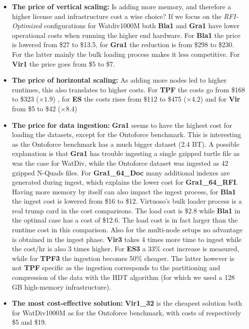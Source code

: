 \begin{itemize}
	\item \textbf{The price of vertical scaling:} Is adding more memory, and therefore a higher license and infrastructure cost a wise choice? If we focus on the \emph{RFI-Optimized} configurations for Watdiv1000M both \textbf{Bla1} and \textbf{Gra1} have lower operational costs when running the higher end hardware. For \textbf{Bla1} the price is lowered from \$27 to \$13.5, for \textbf{Gra1} the reduction is from \$298 to \$230. For the latter mainly the bulk loading process makes it less competitive. For \textbf{Vir1} the price goes from \$5 to \$7.
	
	\item \textbf{The price of horizontal scaling:} As adding more nodes led to higher runtimes, this also translates to higher costs. For \textbf{TPF} the costs go from \$168 to \$323 ($\times 1.9$) , for \textbf{ES} the costs rises from \$112 to \$475 ($\times 4.2$) and for \textbf{Vir} from \$5 to \$42 ($\times 8.4$) 

	\item \textbf{The price for data ingestion:} \textbf{Gra1} seems to have the highest cost for loading the datasets, except for the Ontoforce benchmark. This is interesting as the Ontoforce benchmark has a much bigger dataset (2.4 BT). A possible explanation is that \textbf{Gra1} has trouble ingesting a single gzipped turtle file as was the case for WatDiv, while the Ontoforce dataset was ingested as 42 gzipped N-Quads files.
    For \textbf{Gra1\_64\_Doc} many additional indexes are generated during ingest, which explains the lower cost for \textbf{Gra1\_64\_RFI}. Having more memory by itself can also impact the ingest process, for \textbf{Bla1} the ingest cost is lowered from \$16 to \$12. Virtuoso's bulk loader process is a real trump 
    card in the cost comparisons. The load cost is \$2.8 while \textbf{Bla1} in the optimal case has a cost of \$12.6. The load cost is in fact larger than the runtime cost in this comparison.
    Also for the multi-node setups no advantage is obtained in the ingest phase. \textbf{Vir3} takes 4 times more time to ingest while the cost/hr is also 3 times higher. For \textbf{ES3} a 33\% cost increase is measured, while for \textbf{TPF3} the ingestion becomes 50\% cheaper. The latter however is not \textbf{TPF} specific as the ingestion corresponds to the partitioning and compression of the data with the HDT algorithm (for which we used a 128 GB high-memory infrastructure).

	\item \textbf{The most cost-effective solution:} \textbf{Vir1\_32} is the cheapest solution both for WatDiv1000M as for the Ontoforce benchmark, with costs of respectively \$5 and  \$19. 
\end{itemize}
